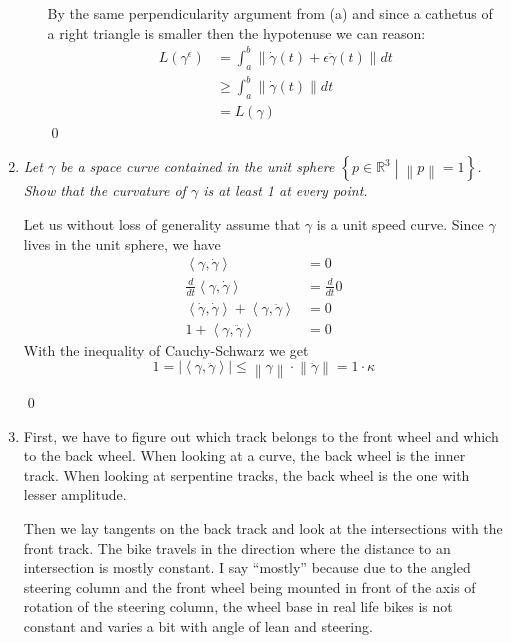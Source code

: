 \documentclass[a4paper,11pt,notitlepage,fullpage]{article}
\newcommand{\ez}{\qed}
\begin{document}
\begin{enumerate}
\begin{enumerate}
By the same perpendicularity argument from (a) and since a cathetus of a right triangle is smaller then the hypotenuse we can reason:
\begin{align*}
L(\gamma^\epsilon) &= \int_a^b \left\|\dot\gamma(t) + \epsilon\ddot\gamma(t)\right\| dt \\
&\geq \int_a^b \left\|\dot\gamma(t) \right\| dt \\
&= L(\gamma)
\end{align*}
\ez
\end{enumerate}

\item \emph{Let $\gamma$ be a space curve contained in the unit sphere $\left\{ p \in \mathbb R^3 \middle| \left\| p \right\| = 1 \right\}$. Show that the curvature of $\gamma$ is at least 1 at every point.}

Let us without loss of generality assume that $\gamma$ is a unit speed curve. Since $\gamma$ lives in the unit sphere, we have
\begin{align*}
\left\langle \gamma, \dot\gamma \right\rangle &= 0 \\
\frac{d}{dt} \left\langle \gamma, \dot\gamma \right\rangle &= \frac{d}{dt} 0 \\
\left\langle \dot\gamma, \dot\gamma \right\rangle + \left\langle \gamma, \ddot\gamma \right\rangle &= 0 \\
1 + \left\langle \gamma, \ddot\gamma \right\rangle &= 0
\end{align*}
With the inequality of Cauchy-Schwarz we get
\begin{equation*}
1 = |\left\langle \gamma, \ddot\gamma \right\rangle| \leq \left\| \gamma \right\| \cdot \left\| \ddot\gamma \right\| = 1 \cdot \kappa
\end{equation*}

\ez

\item First, we have to figure out which track belongs to the front wheel and which to the back wheel. When looking at a curve, the back wheel is the inner track. When looking at serpentine tracks, the back wheel is the one with lesser amplitude.

Then we lay tangents on the back track and look at the intersections with the front track. The bike travels in the direction where the distance to an intersection is mostly constant. I say ``mostly'' because due to the angled steering column and the front wheel being mounted in front of the axis of rotation of the steering column, the wheel base in real life bikes is not constant and varies a bit with angle of lean and steering.

\end{enumerate}
\end{document}
